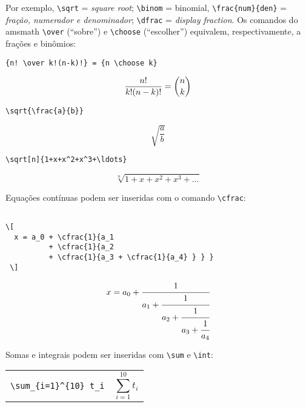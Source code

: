 \documentclass{scrartcl}
\begin{document}
Por exemplo, \verb+\sqrt+ = \textit{square root}; \verb+\binom+ = binomial, \verb+\frac{num}{den}+ = \textit{fração, numerador e denominador}; \verb+\dfrac+ = \textit{display fraction}. Os comandos do \textsf{amsmath} \verb+\over+ (``sobre'') e \verb+\choose+ (``escolher'') equivalem, respectivamente, a frações e binômios:



\begin{verbatim}
{n! \over k!(n-k)!} = {n \choose k}
\end{verbatim}

\begin{displaymath}
{n! \over k!(n-k)!} = {n \choose k}
\end{displaymath}

\begin{verbatim}
\sqrt{\frac{a}{b}}
\end{verbatim}

\begin{displaymath}
\sqrt{\frac{a}{b}}
\end{displaymath}

\begin{verbatim}
\sqrt[n]{1+x+x^2+x^3+\ldots}
\end{verbatim}

\[ \sqrt[n]{1+x+x^2+x^3+\ldots} \]

Equações contínuas podem ser inseridas com o comando \verb+\cfrac+:

\begin{verbatim}

\[ 
  x = a_0 + \cfrac{1}{a_1
          + \cfrac{1}{a_2
          + \cfrac{1}{a_3 + \cfrac{1}{a_4} } } }
 \]

\end{verbatim}

\[ 
  x = a_0 + \cfrac{1}{a_1
          + \cfrac{1}{a_2
          + \cfrac{1}{a_3 + \cfrac{1}{a_4} } } }
 \]

\bigskip


Somas e integrais podem ser inseridas com \verb+\sum+ e \verb+\int+:

\begin{tabular}{cc}
\begin{minipage}{0.4\textwidth}
\verb+\sum_{i=1}^{10} t_i+
\end{minipage} & \begin{minipage}{0.4\textwidth}\[ \sum_{i=1}^{10} t_i \] \end{minipage}
\end{tabular}
\end{document}
